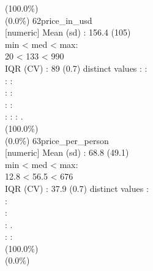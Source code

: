 \documentclass[
  journal,
]{IEEEtran}%
\begin{document}
(100.0\%) \\
(0.0\%) \textbar{} \textbar{} 62\textbar price\_in\_usd\\
{[}numeric{]} \textbar Mean (sd) : 156.4 (105)\\
min \textless{} med \textless{} max:\\
20 \textless{} 133 \textless{} 990\\
IQR (CV) : 89 (0.7)  distinct values \textbar{} \textbar: :\\
: :\\
: :\\
: :\\
: : : . \\
(100.0\%) \\
(0.0\%) \textbar{} \textbar{} 63\textbar price\_per\_person\\
{[}numeric{]} \textbar Mean (sd) : 68.8 (49.1)\\
min \textless{} med \textless{} max:\\
12.8 \textless{} 56.5 \textless{} 676\\
IQR (CV) : 37.9 (0.7)  distinct values \textbar{} \textbar:\\
:\\
:\\
: .\\
: : \\
(100.0\%) \\
(0.0\%) \textbar{}
\end{document}
